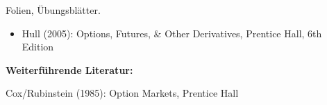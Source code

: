 \begin{course}
\begin{content}
\end{content}

\begin{media}Folien, Übungsblätter.

\end{media}

\begin{literature}\begin{itemize}\item Hull (2005): Options, Futures, \& Other Derivatives, Prentice Hall, 6th Edition  \end{itemize}

\textbf{Weiterführende Literatur:}

 

Cox/Rubinstein (1985): Option Markets, Prentice Hall

\end{literature}



\end{course}